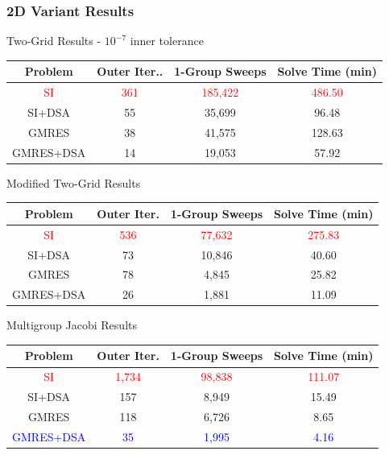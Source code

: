 \documentclass[compress,10pt]{beamer}
\newcommand{\tcr}[1]{\textcolor{red}{#1}}
\newcommand{\tcb}[1]{\textcolor{blue}{#1}}
\begin{document}
\begin{frame}[t]\frametitle{\small 2D Variant Results}{\footnotesize
\begin{block}{Two-Grid Results - $10^{-7}$ inner tolerance}
\begin{table}
\begin{tabular}{|c|c|c|c|}
\hline
Problem & Outer Iter.. & 1-Group Sweeps & Solve Time (min)  \\
\hline \hline
\tcr{SI} & \tcr{361}  &\tcr{185,422}  &  \tcr{486.50} \\ \hline
SI+DSA & 55  & 35,699 &  96.48 \\ \hline
GMRES & 38  & 41,575 &  128.63 \\ \hline
GMRES+DSA & 14 &  19,053  & 57.92  \\ \hline
\end{tabular}
\end{table}
\end{block}
\vspace{-3mm}
\begin{block}{Modified Two-Grid Results}
\begin{table}
\begin{tabular}{|c|c|c|c|}
\hline
Problem & Outer Iter. & 1-Group Sweeps & Solve Time (min)  \\
\hline \hline
\tcr{SI} & \tcr{536}  & \tcr{77,632} & \tcr{275.83}  \\ \hline
SI+DSA & 73  & 10,846 &  40.60 \\ \hline
GMRES & 78  & 4,845 &  25.82 \\ \hline
GMRES+DSA & 26  & 1,881 & 11.09  \\ \hline
\end{tabular}
\end{table}
\end{block}
\vspace{-3mm}
\begin{block}{Multigroup Jacobi Results}
\begin{table}
\begin{tabular}{|c|c|c|c|}
\hline
Problem & Outer Iter.  & 1-Group Sweeps & Solve Time (min)  \\
\hline \hline
\tcr{SI}  & \tcr{1,734} & \tcr{98,838} &  \tcr{111.07} \\ \hline
SI+DSA & 157 & 8,949 &  15.49 \\ \hline
GMRES  & 118 & 6,726 &  8.65 \\ \hline
\tcb{GMRES+DSA} & \tcb{35} & \tcb{1,995} &  \tcb{4.16} \\ \hline
\end{tabular}
\end{table}
\end{block}
}
\end{frame}
\end{document}
